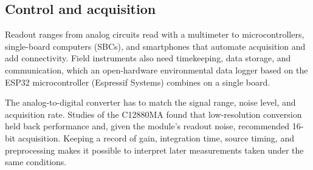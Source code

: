 \subsection{Control and acquisition}

Readout ranges from analog circuits read with a multimeter\citep{prairie2020accurate,bastan2023paired} to microcontrollers, single-board computers (SBCs), and smartphones that automate acquisition and add connectivity.\citep{poh2021spectrophotometer,tonelli2021sensing,sutherland2024synchronising} Field instruments also need timekeeping, data storage, and communication, which an open-hardware environmental data logger based on the ESP32 microcontroller (Espressif Systems) combines on a single board.\citep{rivera2023datalogger}

The analog-to-digital converter has to match the signal range, noise level, and acquisition rate. Studies of the C12880MA found that low-resolution conversion held back performance and, given the module's readout noise, recommended 16-bit acquisition.\citep{troscianko2023osprad,jechow2024characterizing} Keeping a record of gain, integration time, source timing, and preprocessing makes it possible to interpret later measurements taken under the same conditions.\citep{tonelli2021sensing,besozzi2026flexible}
\FloatBarrier

